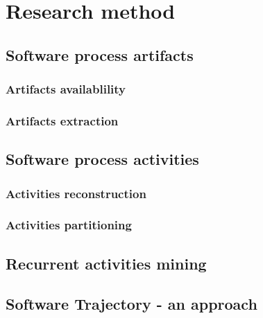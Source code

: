 \chapter{Research method}

\section{Software process artifacts}
\subsection{Artifacts availablility}
\subsection{Artifacts extraction}

\section{Software process activities}
\subsection{Activities reconstruction}
\subsection{Activities partitioning}

\section{Recurrent activities mining}

\section{Software Trajectory - an approach}

